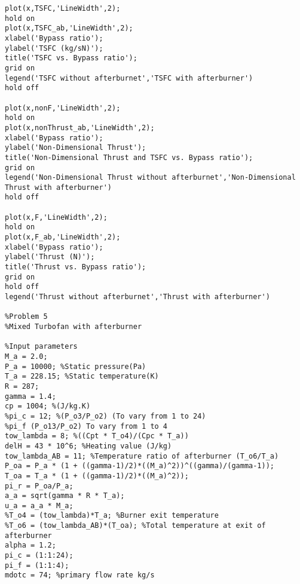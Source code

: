 \documentclass[]{article}
\theoremstyle{definition}
\begin{document}
\begin{lstlisting}[style=Matlab-editor]
plot(x,TSFC,'LineWidth',2);
hold on
plot(x,TSFC_ab,'LineWidth',2);
xlabel('Bypass ratio');
ylabel('TSFC (kg/sN)');
title('TSFC vs. Bypass ratio');
grid on
legend('TSFC without afterburnet','TSFC with afterburner')
hold off

plot(x,nonF,'LineWidth',2);
hold on
plot(x,nonThrust_ab,'LineWidth',2);
xlabel('Bypass ratio');
ylabel('Non-Dimensional Thrust');
title('Non-Dimensional Thrust and TSFC vs. Bypass ratio');
grid on
legend('Non-Dimensional Thrust without afterburnet','Non-Dimensional Thrust with afterburner')
hold off

plot(x,F,'LineWidth',2);
hold on
plot(x,F_ab,'LineWidth',2);
xlabel('Bypass ratio');
ylabel('Thrust (N)');
title('Thrust vs. Bypass ratio');
grid on
hold off
legend('Thrust without afterburnet','Thrust with afterburner')

%Problem 5
%Mixed Turbofan with afterburner

%Input parameters
M_a = 2.0;
P_a = 10000; %Static pressure(Pa)
T_a = 228.15; %Static temperature(K)
R = 287;
gamma = 1.4;
cp = 1004; %(J/kg.K)
%pi_c = 12; %(P_o3/P_o2) (To vary from 1 to 24)
%pi_f (P_o13/P_o2) To vary from 1 to 4
tow_lambda = 8; %((Cpt * T_o4)/(Cpc * T_a))
delH = 43 * 10^6; %Heating value (J/kg)
tow_lambda_AB = 11; %Temperature ratio of afterburner (T_o6/T_a)
P_oa = P_a * (1 + ((gamma-1)/2)*((M_a)^2))^((gamma)/(gamma-1));
T_oa = T_a * (1 + ((gamma-1)/2)*((M_a)^2));
pi_r = P_oa/P_a;
a_a = sqrt(gamma * R * T_a);
u_a = a_a * M_a;
%T_o4 = (tow_lambda)*T_a; %Burner exit temperature
%T_o6 = (tow_lambda_AB)*(T_oa); %Total temperature at exit of afterburner
alpha = 1.2;
pi_c = (1:1:24);
pi_f = (1:1:4);
mdotc = 74; %primary flow rate kg/s


\end{lstlisting}
\end{document}
